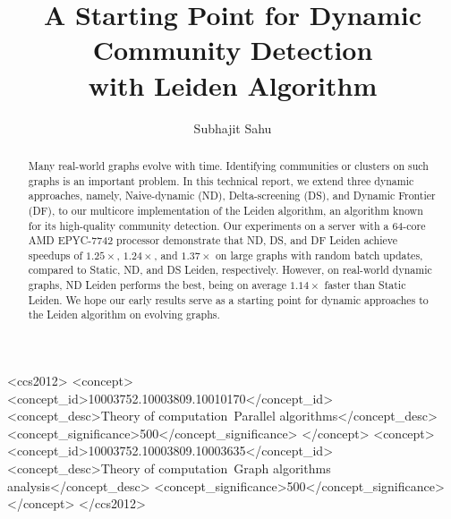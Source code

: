 \documentclass[sigconf,nonacm]{acmart}
\begin{document}
\title[A Starting Point for Dynamic Community Detection with Leiden Algorithm]{A Starting Point for Dynamic Community Detection\\ with Leiden Algorithm}


\author{Subhajit Sahu}



\begin{abstract}
Many real-world graphs evolve with time. Identifying communities or clusters on such graphs is an important problem. In this technical report, we extend three dynamic approaches, namely, Naive-dynamic (ND), Delta-screening (DS), and Dynamic Frontier (DF), to our multicore implementation of the Leiden algorithm, an algorithm known for its high-quality community detection. Our experiments on a server with a 64-core AMD EPYC-7742 processor demonstrate that ND, DS, and DF Leiden achieve speedups of $1.25\times$, $1.24\times$, and $1.37\times$ on large graphs with random batch updates, compared to Static, ND, and DS Leiden, respectively. However, on real-world dynamic graphs, ND Leiden performs the best, being on average $1.14\times$ faster than Static Leiden. We hope our early results serve as a starting point for dynamic approaches to the Leiden algorithm on evolving graphs.
\end{abstract}

\begin{CCSXML}
<ccs2012>
<concept>
<concept_id>10003752.10003809.10010170</concept_id>
<concept_desc>Theory of computation~Parallel algorithms</concept_desc>
<concept_significance>500</concept_significance>
</concept>
<concept>
<concept_id>10003752.10003809.10003635</concept_id>
<concept_desc>Theory of computation~Graph algorithms analysis</concept_desc>
<concept_significance>500</concept_significance>
</concept>
</ccs2012>
\end{CCSXML}
\end{document}
